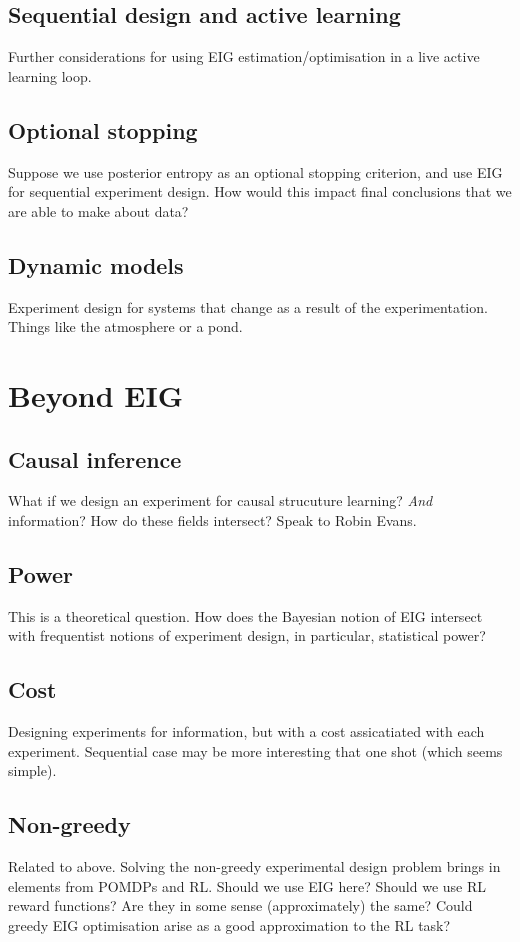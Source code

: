 \subsection{Sequential design and active learning}
Further considerations for using EIG estimation/optimisation in a live active learning loop.

\subsection{Optional stopping}
Suppose we use posterior entropy as an optional stopping criterion, and use EIG for sequential experiment design. How would this impact final conclusions that we are able to make about data?

\subsection{Dynamic models}
Experiment design for systems that change as a result of the experimentation. Things like the atmosphere or a pond.


\section{Beyond EIG}

\subsection{Causal inference}
What if we design an experiment for causal strucuture learning? \textit{And} information? How do these fields intersect? Speak to Robin Evans.

\subsection{Power}
This is a theoretical question. How does the Bayesian notion of EIG intersect with frequentist notions of experiment design, in particular, statistical power?

\subsection{Cost}
Designing experiments for information, but with a cost assicatiated with each experiment. Sequential case may be more interesting that one shot (which seems simple).

\subsection{Non-greedy}
Related to above. Solving the non-greedy experimental design problem brings in elements from POMDPs and RL. Should we use EIG here? Should we use RL reward functions? Are they in some sense (approximately) the same? Could greedy EIG optimisation arise as a good approximation to the RL task?

